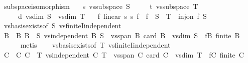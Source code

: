 \begin{isabellebody}
\isanewline
{}\isamarkupfalse%
\ subspace{\isacharunderscore}{\kern0pt}isomorphism{\isacharcolon}{\kern0pt}\isanewline
\ \ \ s{\isacharcolon}{\kern0pt}\ {\isachardoublequoteopen}vs{}{\isachardot}{\kern0pt}subspace\ S{\isachardoublequoteclose}\isanewline
\ \ \ \ \ t{\isacharcolon}{\kern0pt}\ {\isachardoublequoteopen}vs{}{\isachardot}{\kern0pt}subspace\ T{\isachardoublequoteclose}\isanewline
\ \ \ \ \ d{\isacharcolon}{\kern0pt}\ {\isachardoublequoteopen}vs{}{\isachardot}{\kern0pt}dim\ S\ {\isacharequal}{\kern0pt}\ vs{}{\isachardot}{\kern0pt}dim\ T{\isachardoublequoteclose}\isanewline
\ \ \ {\isachardoublequoteopen}{\isasymexists}f{\isachardot}{\kern0pt}\ linear\ s{}\ s{}\ f\ {\isasymand}\ f\ {\isacharbackquote}{\kern0pt}\ S\ {\isacharequal}{\kern0pt}\ T\ {\isasymand}\ inj{\isacharunderscore}{\kern0pt}on\ f\ S{\isachardoublequoteclose}\isanewline
%
\isadelimproof
%
\endisadelimproof
%
\isatagproof
{}\isamarkupfalse%
\ {\isacharminus}{\kern0pt}\isanewline
\ \ \isamarkupfalse%
\ vs{}{\isachardot}{\kern0pt}basis{\isacharunderscore}{\kern0pt}exists{\isacharbrackleft}{\kern0pt}of\ S{\isacharbrackright}{\kern0pt}\ vs{}{\isachardot}{\kern0pt}finiteI{\isacharunderscore}{\kern0pt}independent\isanewline
\ \ \isamarkupfalse%
\ B\ \ B{\isacharcolon}{\kern0pt}\ {\isachardoublequoteopen}B\ {\isasymsubseteq}\ S{\isachardoublequoteclose}\ {\isachardoublequoteopen}vs{}{\isachardot}{\kern0pt}independent\ B{\isachardoublequoteclose}\ {\isachardoublequoteopen}S\ {\isasymsubseteq}\ vs{}{\isachardot}{\kern0pt}span\ B{\isachardoublequoteclose}\ {\isachardoublequoteopen}card\ B\ {\isacharequal}{\kern0pt}\ vs{}{\isachardot}{\kern0pt}dim\ S{\isachardoublequoteclose}\ \ fB{\isacharcolon}{\kern0pt}\ {\isachardoublequoteopen}finite\ B{\isachardoublequoteclose}\isanewline
\ \ \ \ \isamarkupfalse%
\ metis\isanewline
\ \ \isamarkupfalse%
\ vs{}{\isachardot}{\kern0pt}basis{\isacharunderscore}{\kern0pt}exists{\isacharbrackleft}{\kern0pt}of\ T{\isacharbrackright}{\kern0pt}\ vs{}{\isachardot}{\kern0pt}finiteI{\isacharunderscore}{\kern0pt}independent\isanewline
\ \ \isamarkupfalse%
\ C\ \ C{\isacharcolon}{\kern0pt}\ {\isachardoublequoteopen}C\ {\isasymsubseteq}\ T{\isachardoublequoteclose}\ {\isachardoublequoteopen}vs{}{\isachardot}{\kern0pt}independent\ C{\isachardoublequoteclose}\ {\isachardoublequoteopen}T\ {\isasymsubseteq}\ vs{}{\isachardot}{\kern0pt}span\ C{\isachardoublequoteclose}\ {\isachardoublequoteopen}card\ C\ {\isacharequal}{\kern0pt}\ vs{}{\isachardot}{\kern0pt}dim\ T{\isachardoublequoteclose}\ \ fC{\isacharcolon}{\kern0pt}\ {\isachardoublequoteopen}finite\ C{\isachardoublequoteclose}\isanewline

\end{isabellebody}
